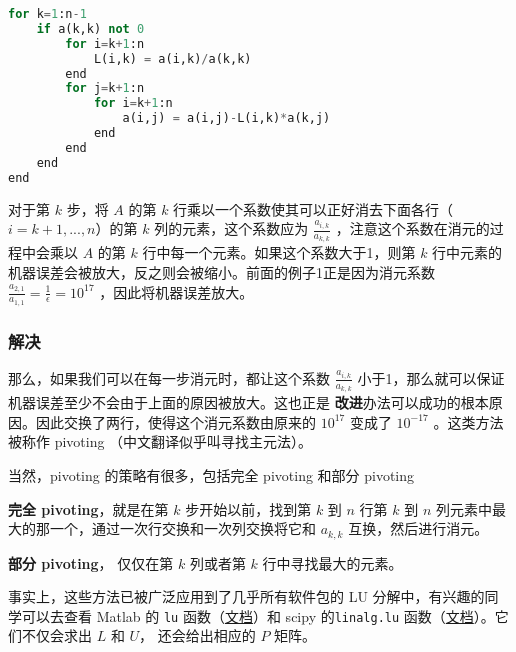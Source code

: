 \begin{lstlisting}[language=python]
for k=1:n-1
    if a(k,k) not 0
        for i=k+1:n
            L(i,k) = a(i,k)/a(k,k)
        end
        for j=k+1:n
            for i=k+1:n
                a(i,j) = a(i,j)-L(i,k)*a(k,j)
            end
        end
    end
end
\end{lstlisting}

对于第  $k$  步，将 $A$  的第  $k$  行乘以一个系数使其可以正好消去下面各行（$i=k+1,...,n$）的第 $k$ 列的元素，这个系数应为  $\frac{a_{i,k}}{a_{k,k}}$  ，注意这个系数在消元的过程中会乘以  $A$  的第  $k $  行中每一个元素。如果这个系数大于1，则第  $k $  行中元素的机器误差会被放大，反之则会被缩小。前面的例子1正是因为消元系数  $\frac{a_{2,1}}{a_{1,1}}=\frac{1}{\epsilon}=10^{17}$  ，因此将机器误差放大。

\subsubsection{解决}

那么，如果我们可以在每一步消元时，都让这个系数  $\frac{a_{i,k}}{a_{k,k}}$ 小于1，那么就可以保证机器误差至少不会由于上面的原因被放大。这也正是	\textbf{改进}办法可以成功的根本原因。因此交换了两行，使得这个消元系数由原来的  $10^{17}$  变成了  $10^{-17}$  。这类方法被称作 pivoting （中文翻译似乎叫寻找主元法）。

当然，pivoting 的策略有很多，包括完全 pivoting 和部分 pivoting

\textbf{完全 pivoting}，就是在第  $k$ 步开始以前，找到第  $k$  到  $n$  行第  $k$  到  $n$  列元素中最大的那一个，通过一次行交换和一次列交换将它和  $a_{k,k}$  互换，然后进行消元。

\textbf{部分 pivoting}， 仅仅在第 $k$ 列或者第 $k$ 行中寻找最大的元素。

事实上，这些方法已被广泛应用到了几乎所有软件包的 LU 分解中，有兴趣的同学可以去查看 Matlab 的 \verb`lu` 函数（\href{https://ww2.mathworks.cn/help/matlab/ref/lu.html}{文档}）和 scipy 的\verb`linalg.lu` 函数（\href{https://docs.scipy.org/doc/scipy/reference/generated/scipy.linalg.lu.html}{文档}）。它们不仅会求出 $L$ 和 $U$， 还会给出相应的 $P$ 矩阵。
